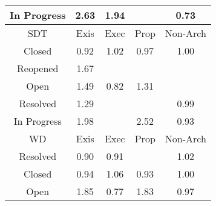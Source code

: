 \begin{tabular}{|c||c|c|c|c|}
\hline
In Progress & \cellcolor[rgb]{0.6854174428414634,0.7336187887143775,0.42} 2.63 & \cellcolor[rgb]{0.7806545116724037,0.7787310844764018,0.42000000000000004} 1.94 &  & \cellcolor[rgb]{0.8497430791741942,0.5547839080911859,0.36376020722924796} 0.73 \\ 
\hline
\hline
SDT & Exis & Exec & Prop & Non-Arch \\ 
\hline
Closed & \cellcolor[rgb]{0.8930794951538717,0.7599096103949932,0.4042075288102803} 0.92 & \cellcolor[rgb]{0.9078304896601287,0.8389723372074294,0.42} 1.02 & \cellcolor[rgb]{0.9033358466568288,0.8084563408423228,0.4137801235463735} 0.97 & \cellcolor[rgb]{0.9097818591919348,0.8398966701435481,0.42} 1.00 \\ 
\hline
Reopened & \cellcolor[rgb]{0.8181213860705133,0.7964785512965589,0.42} 1.67 &  &  &  \\ 
\hline
Open & \cellcolor[rgb]{0.8420345242712346,0.8078058272863743,0.42000000000000004} 1.49 & \cellcolor[rgb]{0.8688696893483527,0.6453165295822031,0.3816117100584626} 0.82 & \cellcolor[rgb]{0.866789509296186,0.8195318728245092,0.42} 1.31 &  \\ 
\hline
Resolved & \cellcolor[rgb]{0.8704972310061799,0.8212881620555588,0.42} 1.29 &  &  & \cellcolor[rgb]{0.9072803670430413,0.827127070670395,0.41746167590683847} 0.99 \\ 
\hline
In Progress & \cellcolor[rgb]{0.7745431522474526,0.7758362300119512,0.42} 1.98 &  & \cellcolor[rgb]{0.7010026478624296,0.7410012542506245,0.42} 2.52 & \cellcolor[rgb]{0.8947854989783505,0.7679846951641919,0.40579979904646035} 0.93 \\ 
\hline
\hline
WD & Exis & Exec & Prop & Non-Arch \\ 
\hline
Resolved & \cellcolor[rgb]{0.887372909995395,0.7328984406448698,0.39888138266236867} 0.90 & \cellcolor[rgb]{0.8889302140999521,0.7402696800731067,0.40033486649328864} 0.91 &  & \cellcolor[rgb]{0.9074655533879991,0.8387994726574731,0.42} 1.02 \\ 
\hline
Closed & \cellcolor[rgb]{0.8967183052154123,0.7771333113529517,0.40760375153438483} 0.94 & \cellcolor[rgb]{0.9017102067941326,0.8360732558498523,0.42} 1.06 & \cellcolor[rgb]{0.8933928397248652,0.7613927746976946,0.4044999837432074} 0.93 & \cellcolor[rgb]{0.909173438912762,0.8360876108537405,0.4192285429852446} 1.00 \\ 
\hline
Open & \cellcolor[rgb]{0.7937562229591949,0.7849371582438291,0.42} 1.85 & \cellcolor[rgb]{0.8574924009425887,0.5914640311282532,0.3709929075464161} 0.77 & \cellcolor[rgb]{0.795161403501376,0.7856027700795991,0.42} 1.83 & \cellcolor[rgb]{0.9040629944995193,0.8118981739643917,0.41445879486621806} 0.97 \\ 

\end{tabular}
